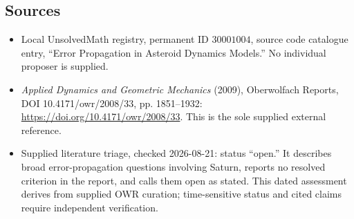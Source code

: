 \documentclass[11pt]{article}
\begin{document}
\subsection{Sources}
\begin{itemize}
\item Local UnsolvedMath registry, permanent ID \(30001004\), source code catalogue entry, ``Error Propagation in Asteroid Dynamics Models.'' No individual proposer is supplied.
\item \emph{Applied Dynamics and Geometric Mechanics} (2009), Oberwolfach Reports, DOI 10.4171/owr/2008/33, pp. 1851--1932: \url{https://doi.org/10.4171/owr/2008/33}. This is the sole supplied external reference.
\item Supplied literature triage, checked 2026-08-21: status ``open.'' It describes broad error-propagation questions involving Saturn, reports no resolved criterion in the report, and calls them open as stated. This dated assessment derives from supplied OWR curation; time-sensitive status and cited claims require independent verification.
\end{itemize}
\end{document}
